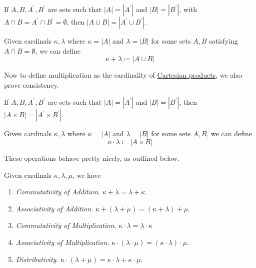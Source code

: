   \begin{lemma}
    \label{thm:well-definedness-of-cardinal-addition}
 
    If $A, B, A^\prime, B^\prime$ are sets such that $|A| = |A^\prime|$ and $|B| = |B^\prime|$, with $A \cap B = A^\prime \cap B^\prime = \emptyset$, then $|A \cup B| = |A^\prime \cup B^\prime|$. 
  \end{lemma}

  \begin{definition}
    \label{def:addition-of-cardinals}
    Given cardinals $\kappa, \lambda$ where $\kappa = |A|$ and $\lambda = |B|$ for some sets $A, B$ satisfying $A \cap B = \emptyset$, we can define 
    \begin{equation}
      \kappa + \lambda \coloneqq |A \cup B|
    \end{equation}
  \end{definition}

  Now to define multiplication as the cardinality of \hyperref[def:cartesian-product]{Cartesian products}, we also prove consistency. 

  \begin{lemma}
    \label{thm:well-definedness-of-cardinal-multiplication}
 
    If $A, B, A^\prime, B^\prime$ are sets such that $|A| = |A^\prime|$ and $|B| = |B^\prime|$, then $|A \times B| = |A^\prime \times B^\prime|$. 
  \end{lemma}

  \begin{definition}
    \label{def:multiplication-of-cardinals}
    Given cardinals $\kappa, \lambda$ where $\kappa = |A|$ and $\lambda = |B|$ for some sets $A, B$, we can define 
    \begin{equation}
      \kappa \cdot \lambda \coloneqq |A \times B| 
    \end{equation}
  \end{definition}

  These operations behave pretty nicely, as outlined below. 

  \begin{theorem}
    \label{thm:commutativity-associativity}
    Given cardinals $\kappa, \lambda, \mu$, we have 
    \begin{enumerate}
      \item \textit{Commutativity of Addition}. $\kappa + \lambda = \lambda + \kappa$. 
      \item \textit{Associativity of Addition}. $\kappa + (\lambda + \mu) = (\kappa + \lambda) + \mu$. 
      \item \textit{Commutativity of Multiplication}. $\kappa \cdot \lambda = \lambda \cdot \kappa$
      \item \textit{Associativity of Multiplication}. $\kappa \cdot (\lambda \cdot \mu) = (\kappa \cdot \lambda) \cdot \mu$. 
      \item \textit{Distributivity}. $\kappa \cdot (\lambda + \mu) = \kappa \cdot \lambda + \kappa \cdot \mu$. 
    \end{enumerate}
  \end{theorem}

